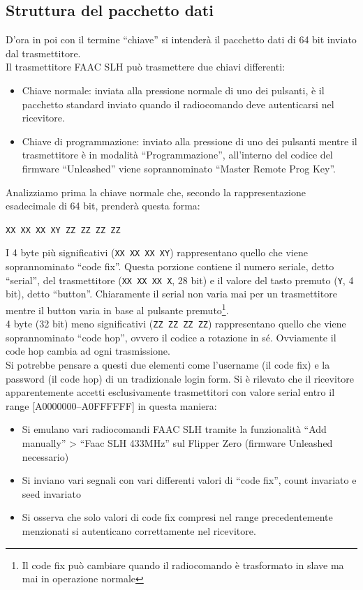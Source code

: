 \subsection{Struttura del pacchetto dati}
\label{sub:payload}
D’ora in poi con il termine “chiave” si intenderà il pacchetto dati di 64 bit inviato dal trasmettitore.\\
Il trasmettitore FAAC SLH può trasmettere due chiavi differenti:
\begin{itemize}
  \item Chiave normale: inviata alla pressione normale di uno dei pulsanti, è il pacchetto standard inviato quando il radiocomando deve autenticarsi nel ricevitore.
  \item Chiave di programmazione: inviato alla pressione di uno dei pulsanti mentre il trasmettitore è in modalità “Programmazione”, all’interno del codice del firmware “Unleashed” viene soprannominato “Master Remote Prog Key”.
\end{itemize}
Analizziamo prima la chiave normale che, secondo la rappresentazione esadecimale di 64 bit, prenderà questa forma:
\begin{center}
  \texttt{XX XX XX XY ZZ ZZ ZZ ZZ}
\end{center}
I 4 byte più significativi (\texttt{XX XX XX XY}) rappresentano quello che viene soprannominato “code fix”. Questa porzione contiene il numero seriale, detto “serial”, del trasmettitore (\texttt{XX XX XX X}, 28 bit) e il valore del tasto premuto (\texttt{Y}, 4 bit), detto “button”. Chiaramente il serial non varia mai per un trasmettitore mentre il button varia in base al pulsante premuto\footnote{Il code fix può cambiare quando il radiocomando è trasformato in slave ma mai in operazione normale}.\\
4 byte (32 bit) meno significativi (\texttt{ZZ ZZ ZZ ZZ}) rappresentano quello che viene soprannominato “code hop”, ovvero il codice a rotazione in sé. Ovviamente il code hop cambia ad ogni trasmissione.\\
Si potrebbe pensare a questi due elementi come l’username (il code fix) e la password (il code hop) di un tradizionale login form.
Si è rilevato che il ricevitore apparentemente accetti esclusivamente trasmettitori con valore serial entro il range [A0000000--A0FFFFFF] in questa maniera:\\
\begin{itemize}
  \item Si emulano vari radiocomandi FAAC SLH tramite la funzionalità “Add manually” > “Faac SLH 433MHz” sul Flipper Zero (firmware Unleashed necessario)
  \item Si inviano vari segnali con vari differenti valori di “code fix”, count invariato e seed invariato
  \item Si osserva che solo valori di code fix compresi nel range precedentemente menzionati si autenticano correttamente nel ricevitore.
\end{itemize}
